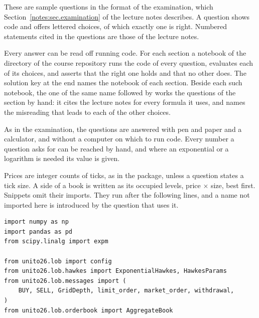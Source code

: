 These are sample questions in the format of the examination,
which Section~\ref{notes:sec.examination} of the lecture notes describes.
A question shows code and offers lettered choices,
of which exactly one is right.
Numbered statements cited in the questions are those of the lecture notes.

Every answer can be read off running code.
For each section a notebook of the directory 
of the course repository runs the code of every question,
evaluates each of its choices,
and asserts that the right one holds and that no other does.
The solution key at the end names the notebook of each section.
Beside each such notebook,
the one of the same name followed by 
works the questions of the section by hand:
it cites the lecture notes for every formula it uses,
and names the misreading that leads to each of the other choices.

As in the examination, the questions are answered with pen and paper and a calculator,
and without a computer on which to run code.
Every number a question asks for can be reached by hand,
and where an exponential or a logarithm is needed its value is given.

Prices are integer counts of ticks, as in the package,
unless a question states a tick size.
A side of a book is written as its occupied levels, price $\times$ size,
best first.
Snippets omit their imports.
They run after the following lines,
and a name not imported here is introduced by the question that uses it.
\begin{lstlisting}[caption={The standing imports}, label=listing.standingImports]
import numpy as np
import pandas as pd
from scipy.linalg import expm

from unito26.lob import config
from unito26.lob.hawkes import ExponentialHawkes, HawkesParams
from unito26.lob.messages import (
    BUY, SELL, GridDepth, limit_order, market_order, withdrawal,
)
from unito26.lob.orderbook import AggregateBook
\end{lstlisting}
